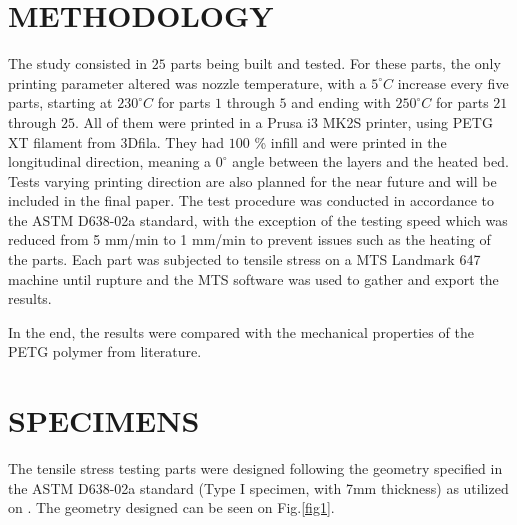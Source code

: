 \documentclass[10pt,fleqn,a4paper,twoside]{article}
\begin{document}
\section{METHODOLOGY}

The study consisted in $25$ parts being built and tested. For these parts, the only printing parameter altered was nozzle temperature, with a $5^\circ C$ increase every five parts, starting at $230^\circ C$ for parts $1$ through $5$ and ending with $250^\circ C$ for parts $21$ through $25$. All of them were printed in a Prusa i3 MK2S printer, using PETG XT filament from 3Dfila. They had $100$ \% infill and were printed in the longitudinal direction, meaning a $0^\circ$ angle between the layers and the heated bed. Tests varying printing direction are also planned for the near future and will be included in the final paper. 
The test procedure was conducted in accordance to the ASTM D638-02a standard, with the exception of the testing speed which was reduced from 5 mm/min to 1 mm/min to prevent issues such as the heating of the parts.
Each part was subjected to tensile stress on a MTS Landmark 647 machine until rupture and the MTS software was used to gather and export the results. 

In the end, the results were compared with the mechanical properties of the PETG polymer from literature. 



\section{SPECIMENS}

The tensile stress testing parts were designed following the geometry specified in the ASTM D638-02a standard (Type I specimen, with 7mm thickness) as utilized on \citep{test_on_fdm}. The geometry designed can be seen on Fig.\ref{fig1}.
\end{document}
